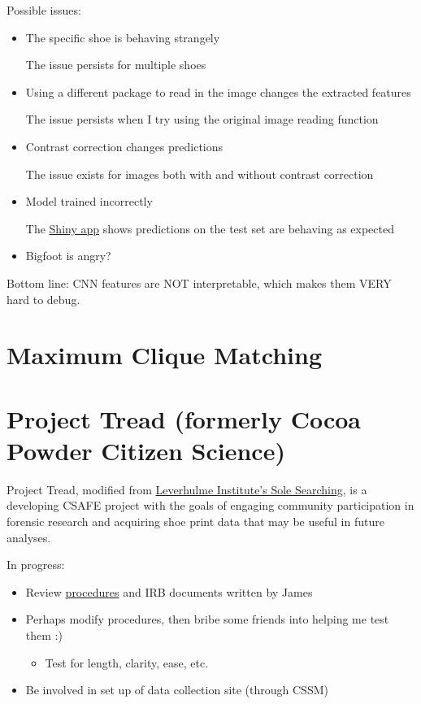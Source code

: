 \documentclass[]{book}
\providecommand{\tightlist}{%
  \setlength{\itemsep}{0pt}\setlength{\parskip}{0pt}}
\begin{document}
Possible issues:

\begin{itemize}
\item
  The specific shoe is behaving strangely

  The issue persists for multiple shoes
\item
  Using a different package to read in the image changes the extracted features

  The issue persists when I try using the original image reading function
\item
  Contrast correction changes predictions

  The issue exists for images both with and without contrast correction
\item
  Model trained incorrectly

  The \href{https://bigfoot.csafe.iastate.edu:442/tiltonm/NNPreview/}{Shiny app} shows predictions on the test set are behaving as expected
\item
  Bigfoot is angry?
\end{itemize}

Bottom line: CNN features are NOT interpretable, which makes them VERY hard to debug.

\hypertarget{maxclique}{%
\section{Maximum Clique Matching}\label{maxclique}}

\hypertarget{cocoa}{%
\section{Project Tread (formerly Cocoa Powder Citizen Science)}\label{cocoa}}

Project Tread, modified from \href{https://www.dundee.ac.uk/leverhulme/citizenscience/details/sole-searching.php}{Leverhulme Institute's Sole Searching}, is a developing CSAFE project with the goals of engaging community participation in forensic research and acquiring shoe print data that may be useful in future analyses.

In progress:

\begin{itemize}
\tightlist
\item
  Review \href{https://forensicstats.org/project-tread/}{procedures} and IRB documents written by James
\item
  Perhaps modify procedures, then bribe some friends into helping me test them :)

  \begin{itemize}
  \tightlist
  \item
    Test for length, clarity, ease, etc.
  \end{itemize}
\item
  Be involved in set up of data collection site (through CSSM)
\end{itemize}
\end{document}
